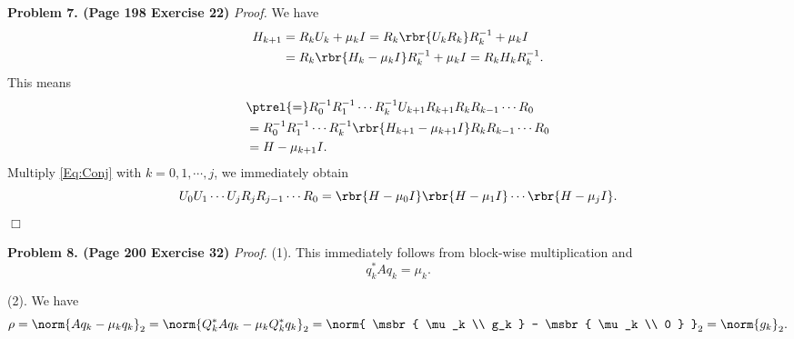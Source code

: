 \documentclass[english, nochinese]{pnote}
\begin{document}
\textbf{Problem 7. (Page 198 Exercise 22)} \textit{Proof.} We have
\begin{equation}
\begin{split}
H_{ k + 1 } &= R_k U_k + \mu_k I = R_k \rbr{ U_k R_k } R_k^{-1} + \mu_k I \\
&= R_k \rbr{ H_k - \mu_k I } R_k^{-1} + \mu_k I = R_k H_k R_k^{-1}.
\end{split}
\end{equation}
This means
\begin{equation} \label{Eq:Conj}
\begin{split}
&\ptrel{=} R_0^{-1} R_1^{-1} \cdots R_k^{-1} U_{ k + 1 } R_{ k + 1 } R_k R_{ k - 1 } \cdots R_0 \\
&= R_0^{-1} R_1^{-1} \cdots R_k^{-1} \rbr{ H_{ k + 1 } - \mu_{ k + 1 } I } R_k R_{ k - 1 } \cdots R_0 \\
&= H - \mu_{ k + 1 } I.
\end{split}
\end{equation}
Multiply \eqref{Eq:Conj} with $ k = 0, 1, \cdots, j $, we immediately obtain
\begin{equation}
U_0 U_1 \cdots U_j R_j R_{ j - 1 } \cdots R_0 = \rbr{ H - \mu_0 I } \rbr{ H - \mu_1 I } \cdots \rbr{ H - \mu_j I }.
\end{equation}
\hfill$\Box$

\textbf{Problem 8. (Page 200 Exercise 32)} \textit{Proof.} (1). This immediately follows from block-wise multiplication and
\begin{equation}
q_k^{\ast} A q_k = \mu_k.
\end{equation}

(2). We have
\begin{equation}
\rho = \norm{ A q_k - \mu_k q_k }_2 = \norm{ Q_k^{\ast} A q_k - \mu_k Q_k^{\ast} q_k }_2 = \norm{ \msbr{ \mu_k \\ g_k } - \msbr{ \mu_k \\ 0 } }_2 = \norm{g_k}_2.
\end{equation}
\end{document}
